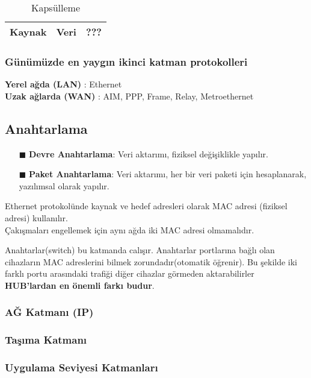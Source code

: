\begin{table}[h]
	\centering
	\caption{Kapsülleme}
	\label{tab:table_kapsulleme}
	\begin{tabular}{|c|c|c|}
		\hline
		Kaynak & Veri & ??? \\
		\hline
	\end{tabular}
\end{table}

\subsubsection*{Günümüzde en yaygın ikinci katman protokolleri}
\textbf{Yerel ağda (LAN)} : Ethernet \\
\textbf{Uzak ağlarda (WAN)} : AIM, PPP, Frame, Relay, Metroethernet
\subsection*{Anahtarlama}
\begin{enumerate}
	\item[$\blacksquare$] \textbf{Devre Anahtarlama}: Veri aktarımı, fiziksel değişiklikle yapılır.
	\item[$\blacksquare$] \textbf{Paket Anahtarlama}: Veri aktarımı, her bir veri paketi için hesaplanarak, yazılımsal olarak yapılır.
\end{enumerate}
Ethernet protokolünde kaynak ve hedef adresleri olarak MAC adresi (fiziksel adresi) kullanılır.\\
	Çakışmaları engellemek için aynı ağda iki MAC adresi olmamalıdır.

Anahtarlar(switch) bu katmanda calışır. Anahtarlar portlarına bağlı olan cihazların MAC adreslerini bilmek zorundadır(otomatik öğrenir). Bu şekilde iki farklı portu arasındaki trafiği diğer cihazlar görmeden aktarabilirler \textbf{HUB'lardan en önemli farkı budur}.
\subsubsection{AĞ Katmanı (IP) }

\subsubsection{Taşıma Katmanı}

\subsubsection{Uygulama Seviyesi Katmanları}

